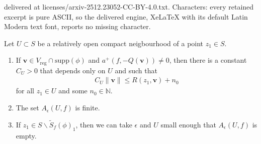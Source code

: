 \documentclass[10pt,a4paper]{amsart}
\newcommand{\NN}{\mathbb{N}}
\newcommand{\Stil}{\widetilde{S}}
\newcommand{\reg}{\mathrm{reg}}
\newcommand{\supp}{\mathrm{supp}}
\newcommand{\vbf}{\mathbf{v}}
\begin{document}
delivered at licenses/arxiv-2512.23052-CC-BY-4.0.txt. Characters: every retained excerpt is pure ASCII, so the delivered engine, XeLaTeX with its default Latin Modern text font, reports no missing character.
\begin{lem} \label{lemAU} Let $U \subset S$ be a relatively open compact neigbourhood of a point $z_1 \in S$.
\begin{enumerate}
\item If $\vbf \in V_\reg \cap \supp(\phi)$ and $a^+(f,-Q(\vbf)) \neq 0$, then there is a constant $C_U>0$ that depends only on $U$ and such that
\begin{align}
C_U\lVert \vbf \rVert \leq R(z_1,\vbf)+n_0
\end{align}
for all $z_1 \in U$ and some $n_0 \in \NN$.
\item The set $A_\epsilon(U,f)$ is finite. 
\item If $z_1 \in S \smallsetminus \Stil_f(\phi)_1$, then we can take $\epsilon$ and $U$ small enough that $A_\epsilon(U,f)$ is empty.
\end{enumerate}
\end{lem}
\end{document}
